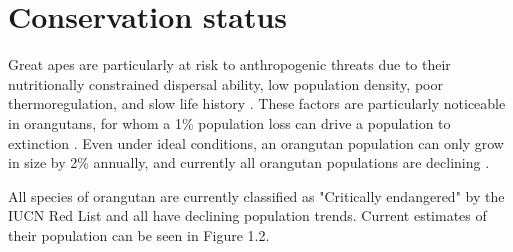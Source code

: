 \section{Conservation status}

Great apes are particularly at risk to anthropogenic threats due to their nutritionally constrained dispersal ability, low population density, poor thermoregulation, and slow life history \citep{Carvalho.2019}. These factors are particularly noticeable in orangutans, for whom a 1\% population loss can drive a population to extinction \citep{Wich.2008}. Even under ideal conditions, an orangutan population can only grow in size by 2\% annually, and currently all orangutan populations are declining \citep{Utami-Atmoko.2016}.

All species of orangutan are currently classified as "Critically endangered" by the IUCN Red List and all have declining population trends. Current estimates of their population can be seen in Figure 1.2.

\begin{table}
    \centering
\caption{Population estimates of orangutan species and sub-species. Zoo population estimates are based on the 2022 International Studbook of the Orangutan \citep{na8}.}
\end{table}

